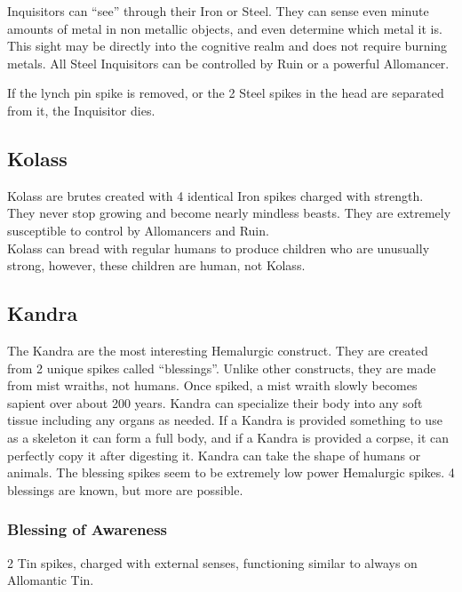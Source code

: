 \documentclass[conference]{IEEEtran}
\newcommand{\n}{\hfill\break}
\begin{document}
Inquisitors can ``see'' through their Iron or Steel.\cite{TFE-CH36}  They can sense even minute amounts of metal in non metallic objects, and even determine which metal it is.\cite{HoA-pre}\cite{HoA-CH34}  This sight may be directly into the cognitive realm and does not require burning metals.\cite{TLM-3WAD} 
All Steel Inquisitors can be controlled by Ruin\cite{HoA-CH13} or a powerful Allomancer.\cite{HoA-CH71}

If the lynch pin spike is removed, or the 2 Steel spikes in the head are separated from it, the Inquisitor dies.\cite{TFE-CH38}
\subsection*{\textbf{Kolass}}
Kolass are brutes created with 4 identical Iron spikes charged with strength.\cite{WoF}  They never stop growing and become nearly mindless beasts.\cite{WoA-CH19}\cite{WoF}
They are extremely susceptible to control by Allomancers and Ruin.\cite{WoF}\cite{HoA}  \\

Kolass can bread with regular humans to produce children who are unusually strong, however, these children are human, not Kolass.\cite{Allo-jack}
\n


\subsection*{\textbf{Kandra}}
The Kandra are the most interesting Hemalurgic construct.  They are created from 2 unique spikes called ``blessings''.\cite{WoF}\cite{SoS-CH7}  Unlike other constructs, they are made from mist wraiths, not humans.\cite{WoF}  Once spiked, a mist wraith slowly becomes sapient over about 200 years.\cite{HoA-CH9}\cite{TFE-CH17}  Kandra can specialize their body into any soft tissue including any organs as needed.\cite{HoA-CH2}  If a Kandra is provided something to use as a skeleton it can form a full body, and if a Kandra is provided a corpse, it can perfectly copy it after digesting it.\cite{WoA-CH6}  Kandra can take the shape of humans\cite{TFE-CH5} or animals.\cite{WoA-CH6}
The blessing spikes seem to be extremely low power Hemalurgic spikes.\cite{kandra-blessing}\cite{WoF}  4 blessings are known, but more are possible.
\subsubsection*{\textbf{Blessing of Awareness}}
2 Tin spikes, charged with external senses, functioning similar to always on Allomantic Tin.\cite{WoF}\cite{kandra-blessing}\cite{HE-TB}
\end{document}
